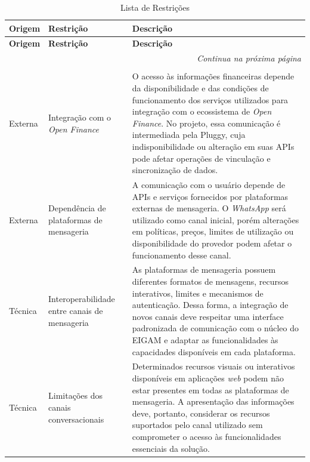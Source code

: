 {\small
\begin{longtable}{|p{2.3cm}|p{4.0cm}|p{8.2cm}|}
\caption{Lista de Restrições} \label{quad:restricoes} \\

\hline
\textbf{Origem} & \textbf{Restrição} & \textbf{Descrição} \\ \hline
\endfirsthead

\hline
\textbf{Origem} & \textbf{Restrição} & \textbf{Descrição} \\ \hline
\endhead

\hline
\multicolumn{3}{r}{\fontsize{10pt}{10pt}\selectfont\textit{Continua na próxima página}} \\
\endfoot

\hline
\multicolumn{3}{c}{\fontsize{10pt}{10pt}\selectfont \textbf{Fonte:} Elaborado pelos autores (2026).} \\
\endlastfoot


Externa &
Integração com o \textit{Open Finance} &
O acesso às informações financeiras depende da disponibilidade e das condições de funcionamento dos serviços utilizados para integração com o ecossistema de \textit{Open Finance}. No projeto, essa comunicação é intermediada pela Pluggy, cuja indisponibilidade ou alteração em suas APIs pode afetar operações de vinculação e sincronização de dados.
\\ \hline


Externa &
Dependência de plataformas de mensageria &
A comunicação com o usuário depende de APIs e serviços fornecidos por plataformas externas de mensageria. O \textit{WhatsApp} será utilizado como canal inicial, porém alterações em políticas, preços, limites de utilização ou disponibilidade do provedor podem afetar o funcionamento desse canal.
\\ \hline


Técnica &
Interoperabilidade entre canais de mensageria &
As plataformas de mensageria possuem diferentes formatos de mensagens, recursos interativos, limites e mecanismos de autenticação. Dessa forma, a integração de novos canais deve respeitar uma interface padronizada de comunicação com o núcleo do EIGAM e adaptar as funcionalidades às capacidades disponíveis em cada plataforma.
\\ \hline


Técnica &
Limitações dos canais conversacionais &
Determinados recursos visuais ou interativos disponíveis em aplicações \textit{web} podem não estar presentes em todas as plataformas de mensageria. A apresentação das informações deve, portanto, considerar os recursos suportados pelo canal utilizado sem comprometer o acesso às funcionalidades essenciais da solução.
\\ \hline



\end{longtable}}
